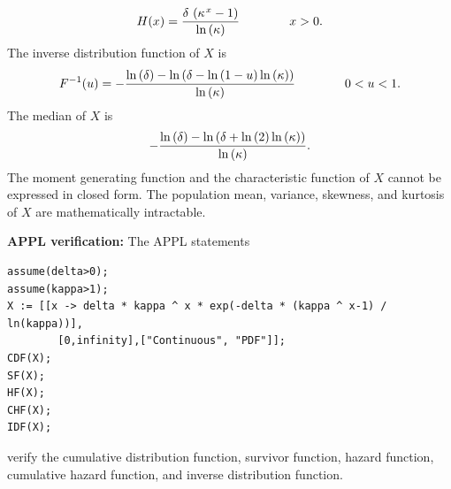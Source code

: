 \documentclass[12pt,fullpage]{article}
\begin{document}
$$
H(x) = {\frac {{\it \delta}\, \left( {{\it \kappa}}^{\kern 0.08 em x}-1 \right) }{
\ln  \left( {\it \kappa} \right) }} \qquad \qquad x > 0.
$$
The inverse distribution function of $X$ is
$$
F ^ {-1}(u) = -{\frac {\ln  \left( {\it \delta} \right) -\ln  \left( {\it 
\delta}-\ln  \left( 1-u \right) \ln  \left( {\it \kappa} \right) 
 \right) }{\ln  \left( {\it \kappa} \right) }} \qquad \qquad 0 < u < 1.
$$
The median of $X$ is
$$
-{\frac {\ln  \left( {\it \delta} \right) -\ln  \left( {\it 
\delta}+\ln  \left(2\right) \ln  \left( {\it \kappa} \right) 
 \right) }{\ln  \left( {\it \kappa} \right) }}.
$$
The moment generating function and the characteristic function of $X$ cannot be expressed in closed form.
The population mean, variance, skewness, and kurtosis of $X$ are mathematically intractable.

\vspace{0.1in}

\noindent
{\bf APPL verification:}
The APPL statements
\begin{verbatim}
assume(delta>0);
assume(kappa>1);
X := [[x -> delta * kappa ^ x * exp(-delta * (kappa ^ x-1) / ln(kappa))],
        [0,infinity],["Continuous", "PDF"]];
CDF(X);
SF(X);
HF(X);
CHF(X);
IDF(X);
\end{verbatim}
verify the cumulative distribution function, survivor function, hazard function, cumulative hazard function, and inverse distribution function.
\end{document}
